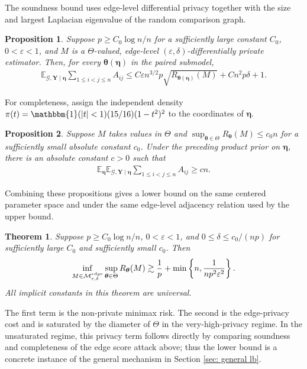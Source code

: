 \documentclass[letterpaper,12pt]{article}
\numberwithin{equation}{section}
\theoremstyle{plain}
\newtheorem{Theorem}{Theorem}
\numberwithin{Theorem}{section}
\newtheorem{proposition}{Proposition}
\numberwithin{proposition}{section}
\numberwithin{Lemma}{section}
{
	\theoremstyle{definition}
	\newtheorem{Definition}{Definition}
	\newtheorem{example}{Example}
	\numberwithin{example}{section}
	\newtheorem{fact}{Fact}
	\numberwithin{fact}{section}
	\newtheorem{remark}{Remark}
}
\newcommand{\rev}[1]{#1}
\newcommand{\furtherrev}[1]{#1}
\newcommand{\1}{\mathbbm{1}}
\def\bth{{\boldsymbol{\theta}}}
\def\E{\mathbb{E}}
\begin{document}
{The soundness bound uses edge-level differential privacy together with the size and largest Laplacian eigenvalue of the random comparison graph.
\begin{proposition}\label{prop: ranking attack soundness}
Suppose $p\geq C_0\log n/n$ for a sufficiently large constant $C_0$, $0<\varepsilon<1$, and $M$ is a $\Theta$-valued, edge-level $(\varepsilon,\delta)$-differentially private estimator. Then, for every $\bth(\bm\eta)$ in the paired submodel,
\begin{align}\label{eq: ranking attack soundness}
\E_{\mathcal G,\bm Y\mid\bm\eta}\sum_{1\leq i<j\leq n}A_{ij}
\leq C\varepsilon n^{3/2}p\sqrt{R_{\bth(\bm\eta)}(M)}+Cn^2p\delta+1.
\end{align}
\end{proposition}

For completeness, assign the independent density $\pi(t)=\1(|t|<1)(15/16)(1-t^2)^2$ to the coordinates of $\bm\eta$.
\begin{proposition}\label{prop: ranking attack completeness}
Suppose $M$ takes values in $\Theta$ and $\sup_{\bth\in\Theta}R_\bth(M)\leq c_0n$ for a sufficiently small absolute constant $c_0$. Under the preceding product prior on $\bm\eta$, there is an absolute constant $c>0$ such that
\begin{align}\label{eq: ranking attack completeness}
\E_{\bm\eta}\E_{\mathcal G,\bm Y\mid\bm\eta}\sum_{1\leq i<j\leq n}A_{ij}\geq cn.
\end{align}
\end{proposition}

Combining these propositions gives a lower bound on the same centered parameter space and under the same edge-level adjacency relation used by the upper bound.
\begin{Theorem}\label{thm: ranking lower bound}
Suppose $p\geq C_0\log n/n$, $0<\varepsilon<1$, and $0\leq\delta\leq c_0/(np)$ for sufficiently large $C_0$ and sufficiently small $c_0$. Then
\begin{align}\label{eq: ranking lower bound}
\inf_{M\in\mathcal M^{\rm edge}_{\varepsilon,\delta}}\sup_{\bth\in\Theta}R_\bth(M)
\gtrsim \frac1p+\min\left\{n,\frac{1}{np^2\varepsilon^2}\right\}.
\end{align}
\furtherrev{All implicit constants in this theorem are universal.}
\end{Theorem}
The first term is the non-private minimax risk. The second is the edge-privacy cost and is saturated by the diameter of $\Theta$ in the very-high-privacy regime. \rev{In the unsaturated regime, this privacy term follows directly by comparing soundness and completeness of the edge score attack above; thus the lower bound is a concrete instance of the general mechanism in Section \ref{sec: general lb}.}

}
\end{document}
